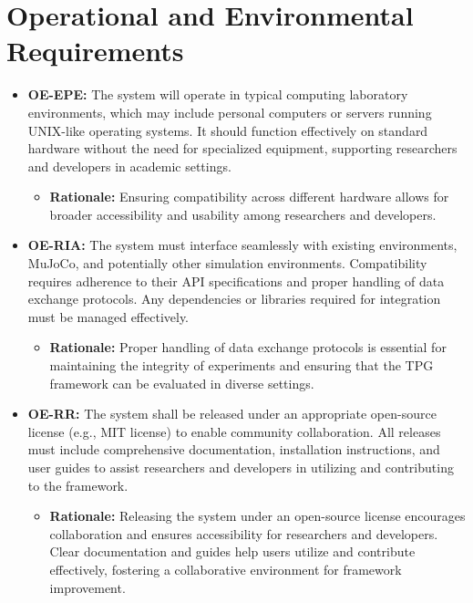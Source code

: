 \documentclass[12pt]{article}
\begin{document}
\section{Operational and Environmental Requirements}
\begin{itemize}
\item \textbf{OE-EPE:} The system will operate in typical computing laboratory environments, which may include personal computers or servers running UNIX-like operating systems. It should function effectively on standard hardware without the need for specialized equipment, supporting researchers and developers in academic settings.
  \begin{itemize}
    \item \textbf{Rationale:} Ensuring compatibility across different hardware allows for broader accessibility and usability among researchers and developers.
  \end{itemize}

\item \textbf{OE-RIA:} The system must interface seamlessly with existing environments, MuJoCo, and potentially other simulation environments. Compatibility requires adherence to their API specifications and proper handling of data exchange protocols. Any dependencies or libraries required for integration must be managed effectively.
  \begin{itemize}
    \item \textbf{Rationale:} Proper handling of data exchange protocols is essential for maintaining the integrity of experiments and ensuring that the TPG framework can be evaluated in diverse settings.
  \end{itemize}

\item \textbf{OE-RR:} The system shall be released under an appropriate open-source license (e.g., MIT license) to enable community collaboration. All releases must include comprehensive documentation, installation instructions, and user guides to assist researchers and developers in utilizing and contributing to the framework.
  \begin{itemize}
    \item \textbf{Rationale:} Releasing the system under an open-source license encourages collaboration and ensures accessibility for researchers and developers. Clear documentation and guides help users utilize and contribute effectively, fostering a collaborative environment for framework improvement.
  \end{itemize}


\end{itemize}
\end{document}
